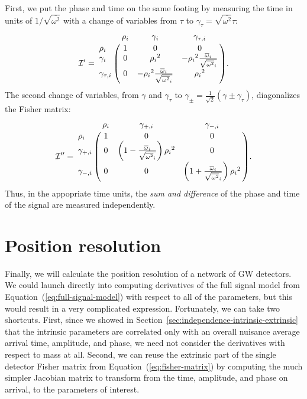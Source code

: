 \documentclass[amsmath,amssymb,aps,prx,reprint,nopreprintnumbers,nofootinbib]{revtex4-1}
\begin{document}
First, we put the phase and time on the same footing by measuring the time in units of $1 / \sqrt{\overline{\omega^2}}$ with a change of variables from $\tau$ to $\gamma_\tau = \sqrt{\overline{\omega^2}} \tau$:
%
\begin{equation}
    \mathcal{I}' = \bordermatrix{
        ~ & \rho_i & \gamma_i & \gamma_{\tau,i} \cr
        \rho_i & 1 & 0 & 0 \cr
        \gamma_i & 0 & {\rho_i}^2 & -{\rho_i}^2\frac{{\overline{\omega}}_i}{\sqrt{{\overline{\omega^2}}_i}} \cr
        \gamma_{\tau,i} & 0 & -{\rho_i}^2\frac{{\overline{\omega}}_i}{\sqrt{{\overline{\omega^2}}_i}} & {\rho_i}^2
    }.
\end{equation}
%
The second change of variables, from $\gamma$ and $\gamma_\tau$ to $\gamma_\pm = \frac{1}{\sqrt{2}}(\gamma \pm \gamma_\tau)$, diagonalizes the Fisher matrix:
%
\begin{equation}\label{eq:fisher-matrix-extrinsic-one-detector}
    \mathcal{I}'' = \bordermatrix{
        ~ & \rho_i & \gamma_{+,i} & \gamma_{-,i} \cr
        \rho_i & 1 & 0 & 0 \cr
        \gamma_{+,i} & 0 & \left(1 - \frac{\overline{\omega}_i}{\sqrt{\overline{\omega^2}_i}}\right){\rho_i}^2 & 0 \cr
        \gamma_{-,i} & 0 & 0 & \left(1 + \frac{\overline{\omega}_i}{\sqrt{\overline{\omega^2}_i}}\right){\rho_i}^2
    }.
\end{equation}
%
Thus, in the appopriate time units, the \textit{sum and difference} of the phase and time of the signal are measured independently.

\section{Position resolution}
\label{sec:position-resolution}

Finally, we will calculate the position resolution of a network of \ac{GW} detectors. We could launch directly into computing derivatives of the full signal model from Equation~(\ref{eq:full-signal-model}) with respect to all of the parameters, but this would result in a very complicated expression. Fortunately, we can take two shortcuts. First, since we showed in Section~\ref{sec:independence-intrinsic-extrinsic} that the intrinsic parameters are correlated only with an overall nuisance average arrival time, amplitude, and phase, we need not consider the derivatives with respect to mass at all. Second, we can reuse the extrinsic part of the single detector Fisher matrix from Equation~(\ref{eq:fisher-matrix}) by computing the much simpler Jacobian matrix to transform from the time, amplitude, and phase on arrival, to the parameters of interest.
\end{document}
